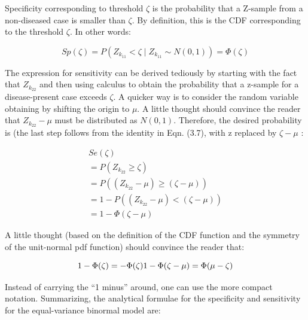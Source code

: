 \documentclass[
]{book}
\begin{document}
Specificity corresponding to threshold \(\zeta\) is the probability that a Z-sample from a non-diseased case is smaller than \(\zeta\). By definition, this is the CDF corresponding to the threshold \(\zeta\). In other words:

\begin{equation} 
Sp\left ( \zeta \right )=P\left ( Z_{k_11} < \zeta\mid Z_{k_11} \sim N\left ( 0,1 \right )\right ) = \Phi\left ( \zeta \right )
\label{eq:binaryTask-Specificity}
\end{equation}

The expression for sensitivity can be derived tediously by starting with the fact that \(Z_{k_22}\) and then using calculus to obtain the probability that a z-sample for a disease-present case exceeds \(\zeta\). A quicker way is to consider the random variable obtaining by shifting the origin to \(\mu\). A little thought should convince the reader that \(Z_{k_22}-\mu\) must be distributed as \(N(0,1)\). Therefore, the desired probability is (the last step follows from the identity in Eqn. (3.7), with z replaced by \(\zeta-\mu\) :

\begin{equation}
\begin{aligned} 
Se\left ( \zeta \right )\\
=P\left ( Z_{k_22} \geq \zeta\right ) \\
=P\left (\left ( Z_{k_22} -\mu  \right ) \geq\left ( \zeta -\mu  \right )\right ) \\
=1-P\left (\left ( Z_{k_22} -\mu  \right ) < \left ( \zeta -\mu  \right )\right ) \\
= 1-\Phi\left ( \zeta -\mu \right )
\end{aligned}
\label{eq:binaryTask-Sensitivity1}
\end{equation}

A little thought (based on the definition of the CDF function and the symmetry of the unit-normal pdf function) should convince the reader that:

\begin{equation} 
1-\Phi(\zeta)=-\Phi(\zeta)\\
1-\Phi(\zeta-\mu)=\Phi(\mu-\zeta)
\label{eq:binaryTask-Sensitivity2}
\end{equation}

Instead of carrying the ``1 minus'' around, one can use the more compact notation. Summarizing, the analytical formulae for the specificity and sensitivity for the equal-variance binormal model are:
\end{document}
